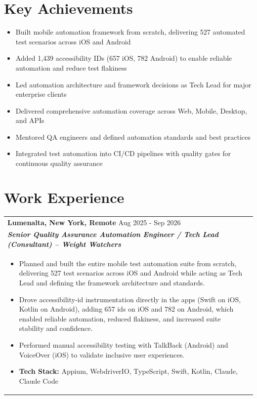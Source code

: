 \documentclass[a4paper,8pt]{article}
\begin{document}
\section{Key Achievements}
\begin{itemize}[nosep,after=\strut, leftmargin=2em, itemsep=2pt]
    \item Built mobile automation framework from scratch, delivering 527 automated test scenarios across iOS and Android
    \item Added 1,439 accessibility IDs (657 iOS, 782 Android) to enable reliable automation and reduce test flakiness
    \item Led automation architecture and framework decisions as Tech Lead for major enterprise clients
    \item Delivered comprehensive automation coverage across Web, Mobile, Desktop, and APIs
    \item Mentored QA engineers and defined automation standards and best practices
    \item Integrated test automation into CI/CD pipelines with quality gates for continuous quality assurance
\end{itemize}

\section{Work Experience}

\begin{tabularx}{\linewidth}{ @{}l r@{} }
\textbf{{Lumenalta, New York, Remote}} \hfill \color[HTML]{371e77} Aug 2025 - Sep 2026 \\[4pt]
\color[HTML]{371e77}\textbf{\textit{Senior Quality Assurance Automation Engineer / Tech Lead (Consultant) -- Weight Watchers}}\ \hfill \color[HTML]{4B28A4} \\[5pt]
\begin{minipage}[t]{\linewidth}
    \begin{itemize}[nosep,after=\strut, leftmargin=2em, itemsep=2pt]
        \item Planned and built the entire mobile test automation suite from scratch, delivering 527 test scenarios across iOS and Android while acting as Tech Lead and defining the framework architecture and standards.
        \item Drove accessibility-id instrumentation directly in the apps (Swift on iOS, Kotlin on Android), adding 657 ids on iOS and 782 on Android, which enabled reliable automation, reduced flakiness, and increased suite stability and confidence.
        \item Performed manual accessibility testing with TalkBack (Android) and VoiceOver (iOS) to validate inclusive user experiences.
        \item \textbf{Tech Stack:} Appium, WebdriverIO, TypeScript, Swift, Kotlin, Claude, Claude Code
    \end{itemize}
\end{minipage}
\end{tabularx}
\end{document}
